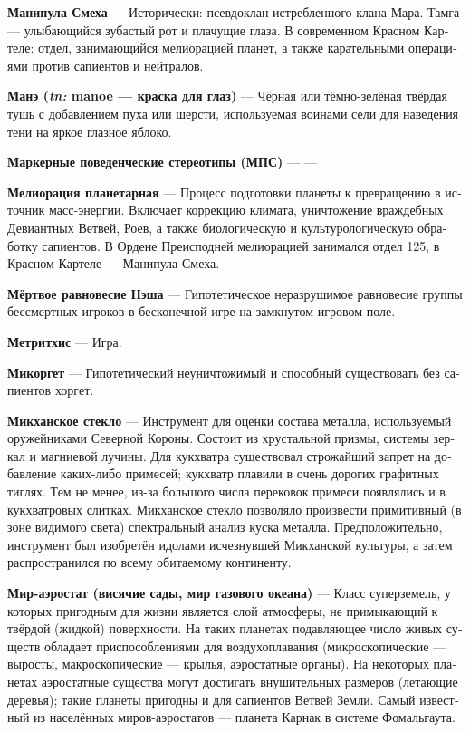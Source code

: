 \documentclass[a4paper,12pt,fleqn]{book}\usepackage{cooltooltips}\usepackage{polyglossia}\setdefaultlanguage[babelshorthands=true]{russian}\setotherlanguage{english}\defaultfontfeatures{Ligatures=TeX,Mapping=tex-text} \usepackage{xcolor}\definecolor{lightgray}{HTML}{bbbbbb}\color{lightgray}\newcommand{\ml}[3]{\textenglish{\textcolor{black}{#3}}}
\newcommand{\theterm}[3]{\textbf{\hypertarget{#1}{#2}} --- #3}
\newcommand{\theorigin}[3]{\textit{#1:} #2 --- #3}
\begin{document}
{\theterm{laughing-manipula}
{Манипула Смеха}
{Исторически: псевдоклан истребленного клана Мара.
Тамга --- улыбающийся зубастый рот и плачущие глаза.
В современном Красном Картеле: отдел, занимающийся мелиорацией планет, а также карательными операциями против сапиентов и нейтралов.}

\theterm{manoe}
{Манэ (\theorigin{tn}{manoe}{краска для глаз})}
{Чёрная или тёмно-зелёная твёрдая тушь с добавлением пуха или шерсти, используемая воинами сели для наведения тени на яркое глазное яблоко.}

\theterm{mbs}
{Маркерные поведенческие стереотипы (МПС)}
{---}

\theterm{melioration}
{Мелиорация планетарная}
{Процесс подготовки планеты к превращению в источник масс-энергии.
Включает коррекцию климата, уничтожение враждебных Девиантных Ветвей, Роев, а также биологическую и культурологическую обработку сапиентов.
В Ордене Преисподней мелиорацией занимался отдел 125, в Красном Картеле --- Манипула Смеха.}

\theterm{dead-nash-equilibrium}
{Мёртвое равновесие Нэша}
{Гипотетическое неразрушимое равновесие группы бессмертных игроков в бесконечной игре на замкнутом игровом поле.}

\theterm{metritchis}
{Метритхис}
{Игра.}

\theterm{micorget} %
{Микоргет}
{Гипотетический неуничтожимый и способный существовать без сапиентов хоргет.}

\theterm{mikchan-mirrors}
{Микханское стекло}
{Инструмент для оценки состава металла, используемый оружейниками Северной Короны.
Состоит из хрустальной призмы, системы зеркал и магниевой лучины.
Для кукхватра существовал строжайший запрет на добавление каких-либо примесей; кукхватр плавили в очень дорогих графитных тиглях.
Тем не менее, из-за большого числа перековок примеси появлялись и в кукхватровых слитках.
Микханское стекло позволяло произвести примитивный (в зоне видимого света) спектральный анализ куска металла.
Предположительно, инструмент был изобретён идолами исчезнувшей Микханской культуры, а затем распространился по всему обитаемому континенту.}

\theterm{aerostatic-world}
{Мир-аэростат (висячие сады, мир газового океана)}
{Класс суперземель, у которых пригодным для жизни является слой атмосферы, не примыкающий к твёрдой (жидкой) поверхности.
На таких планетах подавляющее число живых существ обладает приспособлениями для воздухоплавания (микроскопические --- выросты, макроскопические --- крылья, аэростатные органы).
На некоторых планетах аэростатные существа могут достигать внушительных размеров (летающие деревья);
такие планеты пригодны и для сапиентов Ветвей Земли.
Самый известный из населённых миров-аэростатов --- планета Карнак в системе Фомальгаута.}

}
\end{document}
